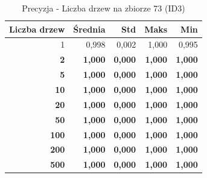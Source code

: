 \begin{table}[htbp]
\centering
\small
\setlength{\tabcolsep}{6pt}
\renewcommand{\arraystretch}{1.2}
\caption{Precyzja - Liczba drzew na zbiorze 73 (ID3)}
\label{tab:ID3_tree_count_73_precision}
\begin{tabular}{r|r|r|r|r}
\toprule
Liczba drzew & Średnia & Std & Maks & Min \\
\hline
1 & 0,998 & 0,002 & 1,000 & 0,995 \\
\textbf{2} & \textbf{1,000} & \textbf{0,000} & \textbf{1,000} & \textbf{1,000} \\
\textbf{5} & \textbf{1,000} & \textbf{0,000} & \textbf{1,000} & \textbf{1,000} \\
\textbf{10} & \textbf{1,000} & \textbf{0,000} & \textbf{1,000} & \textbf{1,000} \\
\textbf{20} & \textbf{1,000} & \textbf{0,000} & \textbf{1,000} & \textbf{1,000} \\
\textbf{50} & \textbf{1,000} & \textbf{0,000} & \textbf{1,000} & \textbf{1,000} \\
\textbf{100} & \textbf{1,000} & \textbf{0,000} & \textbf{1,000} & \textbf{1,000} \\
\textbf{200} & \textbf{1,000} & \textbf{0,000} & \textbf{1,000} & \textbf{1,000} \\
\textbf{500} & \textbf{1,000} & \textbf{0,000} & \textbf{1,000} & \textbf{1,000} \\
\bottomrule
\end{tabular}
\end{table}